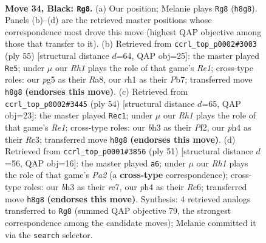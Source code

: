 \documentclass[11pt]{article}
\begin{document}
\clearpage

\begin{figure}[p]\centering
\begin{subfigure}{0.46\textwidth}\centering
\resizebox{\linewidth}{!}{%
\newchessgame
\chessboard[
  setfen={r3k2r/6bp/p1np2p1/4p1P1/1p2P2P/5PBB/PPPK4/R6R b - - 3 34},
  showmover=false,
  pgfstyle=straightmove, color=movearrow, markmove={h8-g8}
]}
\caption{}
\end{subfigure}\hfill
\begin{subfigure}{0.46\textwidth}\centering
\resizebox{\linewidth}{!}{%
\newchessgame
\chessboard[
  setfen={r3r1k1/1pb2p2/2b3p1/p1Bp2Pp/P6P/R1P2P2/1P3K2/3R1B2 b - - 13 28},
  showmover=false,
  pgfstyle=straightmove, color=movearrow, markmove={e8-e5}
]}
\caption{}
\end{subfigure}
\\[4pt]
\begin{subfigure}{0.46\textwidth}\centering
\resizebox{\linewidth}{!}{%
\newchessgame
\chessboard[
  setfen={3r3k/1r3pp1/pp1p4/3Np2p/bP2P3/P1R4P/5PP1/4R1K1 w - - 0 28},
  showmover=false,
  pgfstyle=straightmove, color=movearrow, markmove={e1-c1}
]}
\caption{}
\end{subfigure}\hfill
\begin{subfigure}{0.46\textwidth}\centering
\resizebox{\linewidth}{!}{%
\newchessgame
\chessboard[
  setfen={r5k1/p3R3/2r2p1p/Pppb2p1/3p4/3P2BP/1PP2PP1/R5K1 b - - 5 26},
  showmover=false,
  pgfstyle=straightmove, color=movearrow, markmove={a7-a6}
]}
\caption{}
\end{subfigure}
\caption{\textbf{Move 34, Black: \texttt{Rg8}.} (a) Our position; Melanie plays \texttt{Rg8} (\texttt{h8g8}). Panels (b)--(d) are the retrieved master positions whose correspondence most drove this move (highest QAP objective among those that transfer to it). (b) Retrieved from \texttt{ccrl\_top\_p0002\#3003} (ply 55) [structural distance $d$=64, QAP obj=25]: the master played \texttt{Re5}; under $\mu$ our \emph{Rh1} plays the role of that game's \emph{Re1}; cross-type roles: our \emph{p}g5 as their \emph{R}a8, our \emph{r}h1 as their \emph{P}b7; transferred move \texttt{h8g8} \textbf{(endorses this move)}. (c) Retrieved from \texttt{ccrl\_top\_p0002\#3445} (ply 54) [structural distance $d$=65, QAP obj=23]: the master played \texttt{Rec1}; under $\mu$ our \emph{Rh1} plays the role of that game's \emph{Re1}; cross-type roles: our \emph{b}h3 as their \emph{P}f2, our \emph{p}h4 as their \emph{R}c3; transferred move \texttt{h8g8} \textbf{(endorses this move)}. (d) Retrieved from \texttt{ccrl\_top\_p0001\#3856} (ply 51) [structural distance $d$=56, QAP obj=16]: the master played \texttt{a6}; under $\mu$ our \emph{Rh1} plays the role of that game's \emph{Pa2} (a \textbf{cross-type} correspondence); cross-type roles: our \emph{b}h3 as their \emph{r}e7, our \emph{p}h4 as their \emph{R}c6; transferred move \texttt{h8g8} \textbf{(endorses this move)}. Synthesis: 4 retrieved analogs transferred to \texttt{Rg8} (summed QAP objective 79, the strongest correspondence among the candidate moves); Melanie committed it via the \texttt{search} selector.}
\label{fig:thought-m67}
\end{figure}
\end{document}
